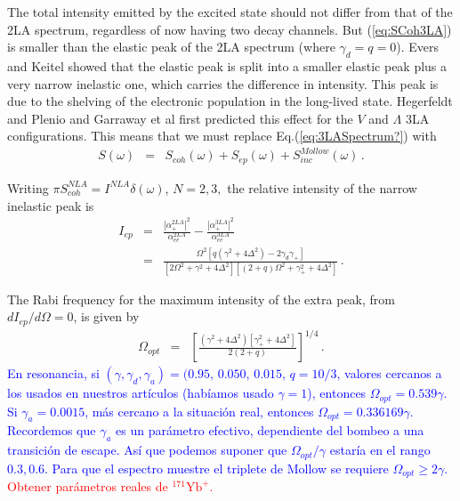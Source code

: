 \documentclass[twocolumn,aps,eqsecnum,showkeys,amsmath]{revtex4-2}
\begin{document}
The total intensity emitted by the excited state should not differ from that 
of the 2LA spectrum, regardless of now having two decay channels. But 
(\ref{eq:SCoh3LA}) is smaller than the elastic peak of the 2LA spectrum 
(where $\gamma_d=q=0$). Evers and Keitel \cite{EvKe02} showed that 
the elastic peak is split into a smaller elastic peak plus a very narrow 
inelastic one, which carries the difference in intensity. This peak is due 
to the shelving of the electronic population in the long-lived state. 
Hegerfeldt and Plenio \cite{HePl95} and Garraway et al \cite{GaKK95} 
first predicted this effect for the $V$ and $\Lambda$ 3LA configurations. 
This means that we must replace Eq.(\ref{eq:3LASpectrum?}) with 
%
\begin{eqnarray} 	\label{eq:Full3LASpectrum}
S(\omega) &=& S_{coh}(\omega) +S_{ep}(\omega) 
	+S_{inc}^{Mollow}(\omega) \,.
\end{eqnarray}

Writing $\pi S_{coh}^{NLA} =I^{NLA} \delta(\omega)$, $N=2,3,$ the 
relative intensity of the narrow inelastic peak is   
%
\begin{eqnarray}
I_{ep} &=& \frac{|\alpha_+^{2LA} |^2}{ \alpha_{ee}^{2LA} } 
	-\frac{|\alpha_+^{3LA} |^2}{ \alpha_{ee}^{3LA} } 	\\
&=& \frac{ \Omega^2 [q(\gamma^2 +4\Delta^2) -2\gamma_d \gamma_+]}
	{[2\Omega^2 +\gamma^2 +4\Delta^2 ]
	[(2+q)\Omega^2 +\gamma_+^2 +4\Delta^2 ] } \,. 
	\nonumber 	
\end{eqnarray}

The Rabi frequency for the maximum intensity of the extra peak, from 
$d I_{ep}/d \Omega =0$, is given by 
%
\begin{eqnarray}
\Omega_{opt} &=& \left[ \frac{ (\gamma^2 +4\Delta^2) 
\left[ \gamma_+^2 +4\Delta^2 \right] }{ 2(2+q) } \right]^{1/4} \,.
\end{eqnarray}
\textcolor{blue}{En resonancia, si 
$(\gamma, \gamma_d, \gamma_a) =(0.95,\,0.050,\, 0.015$, $q=10/3$, 
valores cercanos a los usados en nuestros artículos (hab\'iamos 
usado $\gamma=1$), entonces $\Omega_{opt} = 0.539 \gamma$. 
Si $\gamma_a = 0.0015$, m\'as cercano a la situaci\'on real, entonces 
$\Omega_{opt} = 0.336169 \gamma$. Recordemos que $\gamma_a$ es un 
par\'ametro efectivo, dependiente del bombeo a una transici\'on de 
escape. As\'i que podemos suponer que $\Omega_{opt}/\gamma$ estar\'ia 
en el rango $0.3, 0.6$. Para que el espectro muestre el triplete de Mollow 
se requiere $\Omega_{opt} \geq 2 \gamma$. } \textcolor{red}{Obtener 
par\'ametros reales de $^{171} \mathrm{Yb}^+$.}
\end{document}
